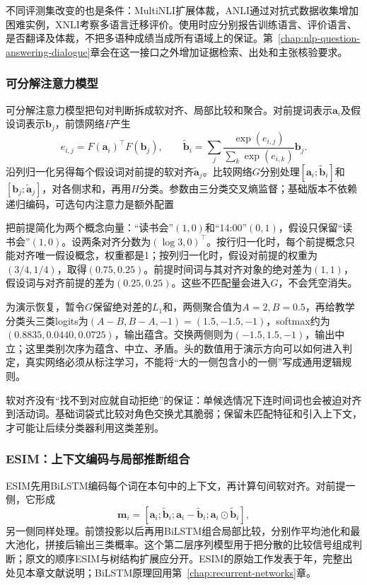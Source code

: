 不同评测集改变的也是条件：MultiNLI扩展体裁，ANLI通过对抗式数据收集增加困难实例，XNLI考察多语言迁移评价。使用时应分别报告训练语言、评价语言、是否翻译及体裁，不把多语种成绩当成所有语域上的保证。第~\ref{chap:nlp-question-answering-dialogue}章会在这一接口之外增加证据检索、出处和主张核验要求。

\subsubsection{可分解注意力模型}
\label{sec:nlp-classification-decomposable}

可分解注意力模型把句对判断拆成软对齐、局部比较和聚合。对前提词表示$\bm a_i$及假设词表示$\bm b_j$，前馈网络$F$产生
\[
  e_{i,j}=F(\bm a_i)^\top F(\bm b_j),\qquad
  \widetilde{\bm b}_i=\sum_j
  \frac{\exp(e_{i,j})}{\sum_k\exp(e_{i,k})}\bm b_j.
\]
沿列归一化另得每个假设词对前提的软对齐$\widetilde{\bm a}_j$。比较网络$G$分别处理$[\bm a_i;\widetilde{\bm b}_i]$和$[\bm b_j;\widetilde{\bm a}_j]$，对各侧求和，再用$H$分类。参数由三分类交叉熵监督；基础版本不依赖递归编码，可选句内注意力是额外配置

把前提简化为两个概念向量：“读书会”$(1,0)$和“14:00”$(0,1)$，假设只保留“读书会”$(1,0)$。设两条对齐分数为$(\log3,0)^\top$。按行归一化时，每个前提概念只能对齐唯一假设概念，权重都是1；按列归一化时，假设对前提的权重为$(3/4,1/4)$，取得$(0.75,0.25)$。前提时间词与其对齐对象的绝对差为$(1,1)$，假设词与对齐前提的差为$(0.25,0.25)$。这些不匹配量会进入$G$，不会凭空消失。

为演示恢复，暂令$G$保留绝对差的$L_1$和，两侧聚合值为$A=2,B=0.5$，再给教学分类头三类logits为$(A-B,B-A,-1)=(1.5,-1.5,-1)$，softmax约为$(0.8835,0.0440,0.0725)$，输出蕴含。交换两侧则为$(-1.5,1.5,-1)$，输出中立；这里类别次序为蕴含、中立、矛盾。头的数值用于演示方向可以如何进入判定，真实网络必须从标注学习，不能将“大的一侧包含小的一侧”写成通用逻辑规则。

软对齐没有“找不到对应就自动拒绝”的保证：单候选情况下连时间词也会被迫对齐到活动词。基础词袋式比较对角色交换尤其脆弱；保留未匹配特征和引入上下文，才可能让后续分类器利用这类差别。

\subsubsection{ESIM：上下文编码与局部推断组合}
\label{sec:nlp-classification-esim}

ESIM先用BiLSTM编码每个词在本句中的上下文，再计算句间软对齐。对前提一侧，它形成
\[
  \bm m_i=[\bm a_i;\widetilde{\bm b}_i;
  \bm a_i-\widetilde{\bm b}_i;
  \bm a_i\odot\widetilde{\bm b}_i],
\]
另一侧同样处理。前馈投影以后再用BiLSTM组合局部比较，分别作平均池化和最大池化，拼接后输出三类概率。这个第二层序列模型用于把分散的比较信号组成判断；原文的顺序ESIM与树结构扩展应分开。ESIM的原始工作发表于\citeyear{nlp-chen2017esim}年，完整出处见本章文献说明；BiLSTM原理回用第~\ref{chap:recurrent-networks}章。

